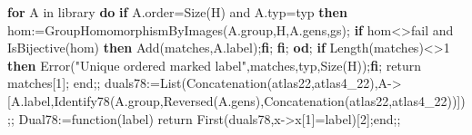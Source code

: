 \documentclass[
  10pt,
  letterpaper,
]{article}
\newenvironment{Shaded}{}{}
\newcommand{\BuiltInTok}[1]{\textcolor[rgb]{0.00,0.50,0.00}{#1}}
\newcommand{\ConstantTok}[1]{\textcolor[rgb]{0.53,0.00,0.00}{#1}}
\newcommand{\ControlFlowTok}[1]{\textcolor[rgb]{0.00,0.44,0.13}{\textbf{#1}}}
\newcommand{\ExtensionTok}[1]{#1}
\newcommand{\FloatTok}[1]{\textcolor[rgb]{0.25,0.63,0.44}{#1}}
\newcommand{\FunctionTok}[1]{\textcolor[rgb]{0.02,0.16,0.49}{#1}}
\newcommand{\NormalTok}[1]{#1}
\newcommand{\OperatorTok}[1]{\textcolor[rgb]{0.40,0.40,0.40}{#1}}
\newcommand{\StringTok}[1]{\textcolor[rgb]{0.25,0.44,0.63}{#1}}
\newcommand{\VariableTok}[1]{\textcolor[rgb]{0.10,0.09,0.49}{#1}}
\begin{document}
\begin{Shaded}
\begin{Highlighting}[]
 \ControlFlowTok{for} \VariableTok{A} \ExtensionTok{in} \VariableTok{library} \ControlFlowTok{do}
  \ControlFlowTok{if} \VariableTok{A}\NormalTok{.}\VariableTok{order}\OperatorTok{=}\BuiltInTok{Size}\NormalTok{(}\VariableTok{H}\NormalTok{) }\ConstantTok{and} \VariableTok{A}\NormalTok{.}\VariableTok{typ}\OperatorTok{=}\VariableTok{typ} \ControlFlowTok{then}
   \VariableTok{hom}\OperatorTok{:=}\BuiltInTok{GroupHomomorphismByImages}\NormalTok{(}\VariableTok{A}\NormalTok{.}\VariableTok{group}\OperatorTok{,}\VariableTok{H}\OperatorTok{,}\VariableTok{A}\NormalTok{.}\VariableTok{gens}\OperatorTok{,}\VariableTok{gs}\NormalTok{)}\OperatorTok{;}
   \ControlFlowTok{if} \VariableTok{hom}\OperatorTok{\textless{}\textgreater{}}\ConstantTok{fail} \ConstantTok{and} \BuiltInTok{IsBijective}\NormalTok{(}\VariableTok{hom}\NormalTok{) }\ControlFlowTok{then} \BuiltInTok{Add}\NormalTok{(}\VariableTok{matches}\OperatorTok{,}\VariableTok{A}\NormalTok{.}\VariableTok{label}\NormalTok{)}\OperatorTok{;}\ControlFlowTok{fi}\OperatorTok{;}
  \ControlFlowTok{fi}\OperatorTok{;}
 \ControlFlowTok{od}\OperatorTok{;}
 \ControlFlowTok{if} \BuiltInTok{Length}\NormalTok{(}\VariableTok{matches}\NormalTok{)}\OperatorTok{\textless{}\textgreater{}}\FloatTok{1} \ControlFlowTok{then} \BuiltInTok{Error}\NormalTok{(}\StringTok{"Unique ordered marked label"}\OperatorTok{,}\VariableTok{matches}\OperatorTok{,}\VariableTok{typ}\OperatorTok{,}\BuiltInTok{Size}\NormalTok{(}\VariableTok{H}\NormalTok{))}\OperatorTok{;}\ControlFlowTok{fi}\OperatorTok{;}
 \ExtensionTok{return} \VariableTok{matches}\NormalTok{[}\FloatTok{1}\NormalTok{]}\OperatorTok{;}
\FunctionTok{end}\OperatorTok{;;}
\VariableTok{duals78}\OperatorTok{:=}\BuiltInTok{List}\NormalTok{(}\BuiltInTok{Concatenation}\NormalTok{(}\VariableTok{atlas22}\OperatorTok{,}\VariableTok{atlas4\_22}\NormalTok{)}\OperatorTok{,}\VariableTok{A}\OperatorTok{{-}\textgreater{}}\NormalTok{[}\VariableTok{A}\NormalTok{.}\VariableTok{label}\OperatorTok{,}\VariableTok{Identify78}\NormalTok{(}\VariableTok{A}\NormalTok{.}\VariableTok{group}\OperatorTok{,}\BuiltInTok{Reversed}\NormalTok{(}\VariableTok{A}\NormalTok{.}\VariableTok{gens}\NormalTok{)}\OperatorTok{,}\BuiltInTok{Concatenation}\NormalTok{(}\VariableTok{atlas22}\OperatorTok{,}\VariableTok{atlas4\_22}\NormalTok{))])}\OperatorTok{;;}
\VariableTok{Dual78}\OperatorTok{:=}\FunctionTok{function}\NormalTok{(}\VariableTok{label}\NormalTok{) }\ExtensionTok{return} \BuiltInTok{First}\NormalTok{(}\VariableTok{duals78}\OperatorTok{,}\VariableTok{x}\OperatorTok{{-}\textgreater{}}\VariableTok{x}\NormalTok{[}\FloatTok{1}\NormalTok{]}\OperatorTok{=}\VariableTok{label}\NormalTok{)[}\FloatTok{2}\NormalTok{]}\OperatorTok{;}\FunctionTok{end}\OperatorTok{;;}

\end{Highlighting}
\end{Shaded}
\end{document}
